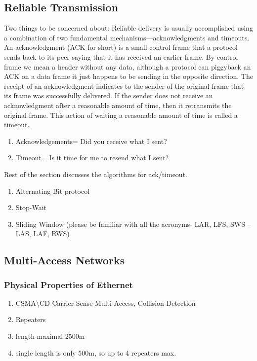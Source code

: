 \documentclass[11pt, a4paper]{article}
\begin{document}
\subsection{Reliable Transmission}
Two things to be concerned about:
Reliable delivery is usually accomplished using a combination of two fundamental mechanisms—acknowledgments and timeouts. An acknowledgment (ACK for short) is a small control frame that a protocol sends back to its peer saying that it has received an earlier frame. By control frame we mean a header without any data, although a protocol can piggyback an ACK on a data frame it just happens to be sending in the opposite direction. The receipt of an acknowledgment indicates to the sender of the original frame that its frame was successfully delivered. If the sender does not receive an acknowledgment after a reasonable amount of time, then it retransmits the original frame. This action of waiting a reasonable amount of time is called a timeout.
\begin{enumerate}
    \item Acknowledgements= Did you receive what I sent?
    \item Timeout= Is it time for me to resend what I sent?
\end{enumerate}
Rest of the section discusses the algorithms for ack/timeout.

\begin{enumerate}
    \item Alternating Bit protocol
    \item Stop-Wait
    \item Sliding Window (please be familiar with all the acronyms- LAR, LFS, SWS -- LAS, LAF, RWS)
\end{enumerate}

\subsection{Multi-Access Networks}
\subsubsection{Physical Properties of Ethernet}
\begin{enumerate}
    \item CSMA\textbackslash CD Carrier Sense Multi Access, Collision Detection
    \item Repeaters
    \item length-maximal 2500m
    \item single length is only 500m, so up to 4 repeaters max.
\end{enumerate}
\end{document}
